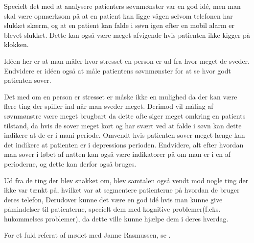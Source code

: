 \begin{description}[style=nextline]
	Specielt det med at analysere patienters søvnmønster var en god idé, men man skal være opmærksom på at en patient kan ligge vågen selvom telefonen har slukket skærm, og at en patient kan falde i søvn igen efter en mobil alarm er blevet slukket.
	Dette kan også være meget afvigende hvis patienten ikke kigger på klokken.
\item[Galvanisk hud respons]
	Idéen her er at man måler hvor stresset en person er ud fra hvor meget de sveder. 
	Endvidere er idéen også at måle patientens søvnmønster for at se hvor godt patienten sover.
	
	Det med om en person er stresset er måske ikke en mulighed da der kan være flere ting der spiller ind når man sveder meget.
	Derimod vil måling af søvnmønstre være meget brugbart da dette ofte siger meget omkring en patients tilstand, da hvis de sover meget kort og har svært ved at falde i søvn kan dette indikere at de er i mani periode.
	Omvendt hvis patienten sover meget længe kan det indikere at patienten er i depressions perioden.
	Endvidere, alt efter hvordan man sover i løbet af natten kan også være indikatorer på om man er i en af perioderne, og dette kan derfor også bruges. 
\item[Andre]
	Ud fra de ting der blev snakket om, blev samtalen også vendt mod nogle ting der ikke var tænkt på, hvilket var at segmentere patienterne på hvordan de bruger deres telefon, 
	Derudover kunne det være en god idé hvis man kunne give påmindelser til patienterne, specielt dem med kognitive problemer(f.eks. hukommelses problemer), da dette ville kunne hjælpe dem i deres hverdag.
\end{description}

For et fuld referat af mødet med Janne Rasmussen, se .